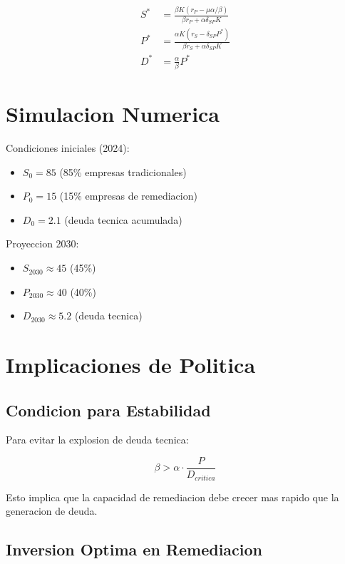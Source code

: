 \documentclass{article}
\begin{document}
\begin{align}
S^* &= \frac{\beta K (r_P - \mu \alpha / \beta)}{\beta r_P + \alpha \delta_{SP} K} \\
P^* &= \frac{\alpha K (r_S - \delta_{SP} P^*)}{\beta r_S + \alpha \delta_{SP} K} \\
D^* &= \frac{\alpha}{\beta} P^*
\end{align}

\section{Simulacion Numerica}

Condiciones iniciales (2024):
\begin{itemize}
    \item $S_0 = 85$ (85\% empresas tradicionales)
    \item $P_0 = 15$ (15\% empresas de remediacion)
    \item $D_0 = 2.1$ (deuda tecnica acumulada)
\end{itemize}

Proyeccion 2030:
\begin{itemize}
    \item $S_{2030} \approx 45$ (45\%)
    \item $P_{2030} \approx 40$ (40\%)
    \item $D_{2030} \approx 5.2$ (deuda tecnica)
\end{itemize}

\section{Implicaciones de Politica}

\subsection{Condicion para Estabilidad}

Para evitar la explosion de deuda tecnica:

\begin{equation}
\beta > \alpha \cdot \frac{P}{D_{critica}}
\end{equation}

Esto implica que la capacidad de remediacion debe crecer mas rapido que la generacion de deuda.

\subsection{Inversion Optima en Remediacion}
\end{document}
